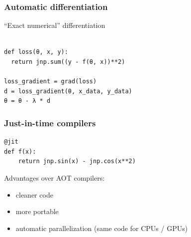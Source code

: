 \begin{frame}[fragile]
    \frametitle{Automatic differentiation}

    \vspace{0.5em}
    ``Exact numerical'' differentiation
    
    \begin{verbatim}

def loss(θ, x, y):
  return jnp.sum((y - f(θ, x))**2)

loss_gradient = grad(loss)
d = loss_gradient(θ, x_data, y_data)
θ = θ - λ * d

    \end{verbatim}

\end{frame}


\begin{frame}[fragile]
    \frametitle{Just-in-time compilers}

    \vspace{0.5em}
    
    \begin{verbatim}
@jit
def f(x):
    return jnp.sin(x) - jnp.cos(x**2)
    \end{verbatim}

    \vspace{0.5em}
    \vspace{0.5em}
    Advantages over AOT compilers:

    \begin{itemize}
        \item cleaner code
    \vspace{0.5em}
        \item more portable
    \vspace{0.5em}
        \item automatic parallelization (same code for CPUs / GPUs)
    \end{itemize}

\end{frame}



